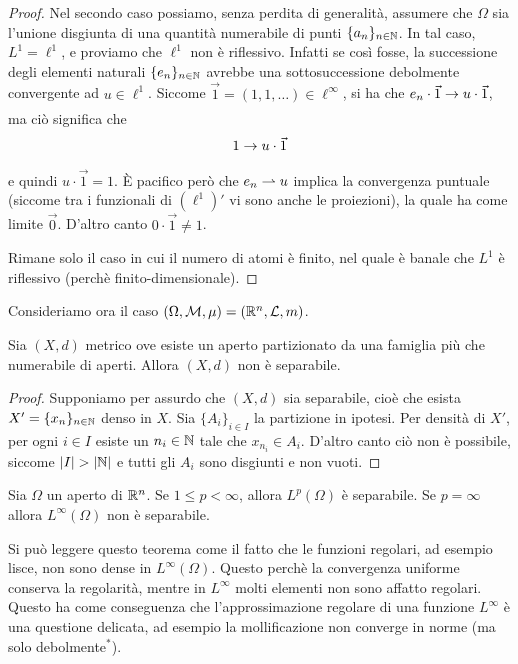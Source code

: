 \begin{proof}
	Nel secondo caso possiamo, senza perdita di generalità, assumere che $\Omega$ sia l'unione disgiunta di una quantità numerabile di punti $\{a_n\}_{n \in \mathbb{N}}$.
	In tal caso, $L^1 = \ell^1$, e proviamo che $\ell^1$ non è riflessivo.
	Infatti se così fosse, la successione degli elementi naturali $\{e_n\}_{n \in \mathbb{N}}$ avrebbe una sottosuccessione debolmente convergente ad $u \in \ell^1$. Siccome $\vec 1 =(1,1, \ldots) \in \ell^\infty$, si ha che $e_n \cdot \vec 1 \underset{{}}{\rightarrow} u \cdot \vec 1$, ma ciò significa che
	\begin{equation*}
		1 \underset{{}}{\rightarrow} u \cdot \vec 1
	\end{equation*}
	e quindi $u \cdot \vec 1 = 1$.
	È pacifico però che $e_n \rightharpoonup u$ implica la convergenza puntuale (siccome tra i funzionali di $(\ell^1)'$ vi sono anche le proiezioni), la quale ha come limite $\vec 0$. D'altro canto $0 \cdot \vec 1 \neq 1$.

	Rimane solo il caso in cui il numero di atomi è finito, nel quale è banale che $L^1$ è riflessivo (perchè finito-dimensionale).
\end{proof}

Consideriamo ora il caso $(\Omega, \mathcal{M}, \mu) = (\mathbb{R}^n, \mathcal{L}, m)$.

\begin{lemma}
\label{lemma:neg_sep_lemma}
	Sia $(X,d)$ metrico ove esiste un aperto partizionato da una famiglia più che numerabile di aperti.
	Allora $(X,d)$ non è separabile.
\end{lemma}
\begin{proof}
	Supponiamo per assurdo che $(X,d)$ sia separabile, cioè che esista $X'=\{x_n\}_{n \in \mathbb{N}}$ denso in $X$. Sia $\{A_i\}_{i \in I}$ la partizione in ipotesi.
	Per densità di $X'$, per ogni $i \in I$ esiste un $n_i \in \mathbb{N}$ tale che $x_{n_i} \in A_i$.
	D'altro canto ciò non è possibile, siccome $\left|{I}\right| > \left|{\mathbb{N}}\right|$ e tutti gli $A_i$ sono disgiunti e non vuoti.
\end{proof}

\begin{theorem}
	Sia $\Omega$ un aperto di $\mathbb{R}^n$. Se $1 \leq p < \infty$, allora $L^p(\Omega)$ è separabile. Se $p=\infty$ allora $L^\infty(\Omega)$ non è separabile.
\end{theorem}

\begin{remark}
	Si può leggere questo teorema come il fatto che le funzioni regolari, ad esempio lisce, non sono dense in $L^\infty(\Omega)$. Questo perchè la convergenza uniforme conserva la regolarità, mentre in $L^\infty$ molti elementi non sono affatto regolari.
	Questo ha come conseguenza che l'approssimazione regolare di una funzione $L^\infty$ è una questione delicata, ad esempio la mollificazione non converge in norme (ma solo debolmente$^*$).
\end{remark}

